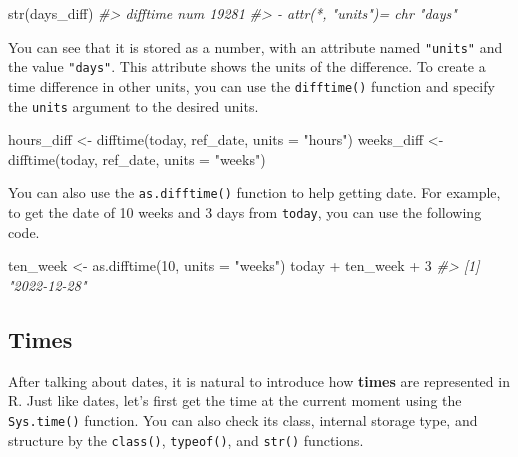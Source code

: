 \documentclass[
]{book}
\newenvironment{Shaded}{\begin{snugshade}}{\end{snugshade}}
\newcommand{\AttributeTok}[1]{\textcolor[rgb]{0.77,0.63,0.00}{#1}}
\newcommand{\CommentTok}[1]{\textcolor[rgb]{0.56,0.35,0.01}{\textit{#1}}}
\newcommand{\DecValTok}[1]{\textcolor[rgb]{0.00,0.00,0.81}{#1}}
\newcommand{\FunctionTok}[1]{\textcolor[rgb]{0.00,0.00,0.00}{#1}}
\newcommand{\NormalTok}[1]{#1}
\newcommand{\OtherTok}[1]{\textcolor[rgb]{0.56,0.35,0.01}{#1}}
\newcommand{\SpecialCharTok}[1]{\textcolor[rgb]{0.00,0.00,0.00}{#1}}
\newcommand{\StringTok}[1]{\textcolor[rgb]{0.31,0.60,0.02}{#1}}
\begin{document}
\begin{Shaded}
\begin{Highlighting}[]
\FunctionTok{str}\NormalTok{(days\_diff)}
\CommentTok{\#\textgreater{}  \textquotesingle{}difftime\textquotesingle{} num 19281}
\CommentTok{\#\textgreater{}  {-} attr(*, "units")= chr "days"}
\end{Highlighting}
\end{Shaded}

You can see that it is stored as a number, with an attribute named \texttt{"units"} and the value \texttt{"days"}. This attribute shows the units of the difference. To create a time difference in other units, you can use the \texttt{difftime()} function and specify the \texttt{units} argument to the desired units.

\begin{Shaded}
\begin{Highlighting}[]
\NormalTok{hours\_diff }\OtherTok{\textless{}{-}} \FunctionTok{difftime}\NormalTok{(today, ref\_date, }\AttributeTok{units =} \StringTok{"hours"}\NormalTok{)}
\NormalTok{weeks\_diff }\OtherTok{\textless{}{-}} \FunctionTok{difftime}\NormalTok{(today, ref\_date, }\AttributeTok{units =} \StringTok{"weeks"}\NormalTok{)}
\end{Highlighting}
\end{Shaded}

You can also use the \texttt{as.difftime()} function to help getting date. For example, to get the date of 10 weeks and 3 days from \texttt{today}, you can use the following code.

\begin{Shaded}
\begin{Highlighting}[]
\NormalTok{ten\_week }\OtherTok{\textless{}{-}} \FunctionTok{as.difftime}\NormalTok{(}\DecValTok{10}\NormalTok{, }\AttributeTok{units =} \StringTok{"weeks"}\NormalTok{)}
\NormalTok{today }\SpecialCharTok{+}\NormalTok{ ten\_week }\SpecialCharTok{+} \DecValTok{3}
\CommentTok{\#\textgreater{} [1] "2022{-}12{-}28"}
\end{Highlighting}
\end{Shaded}

\hypertarget{times}{%
\subsection{Times}\label{times}}

After talking about dates, it is natural to introduce how \textbf{times} are represented in R. Just like dates, let's first get the time at the current moment using the \texttt{Sys.time()} function. You can also check its class, internal storage type, and structure by the \texttt{class()}, \texttt{typeof()}, and \texttt{str()} functions.
\end{document}

